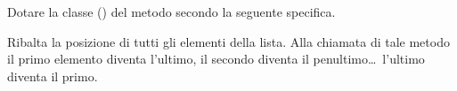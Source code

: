 Dotare la classe  () del metodo  secondo la seguente specifica.

\begin{methodslist}

 {
Ribalta la posizione di tutti gli elementi della lista. Alla chiamata di tale metodo il primo elemento diventa l'ultimo, il secondo diventa il penultimo\ldots\ l'ultimo diventa il primo.
}

\end{methodslist}